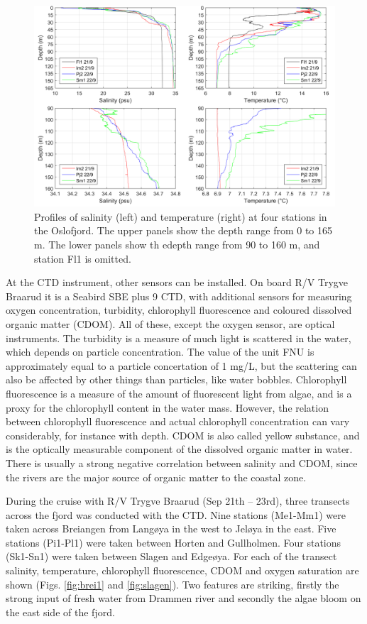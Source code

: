 \documentclass[12pt,a4paper,english]{article}
\begin{document}
\begin{figure}[ht]
\centerline{
\includegraphics*[width=\textwidth]{Figurer/Fig_profiles.png}}
\caption{\small
Profiles of salinity (left) and temperature (right) at four stations in the 
Oslofjord. The upper panels show the depth range from 0 to 165 m.
The lower panels show th edepth range from 90 to 160 m, and station Fl1 is omitted.
}
\label{fig:profiles}
\end{figure}

At the CTD instrument, other sensors can be installed. 
On board R/V Trygve Braarud it is a Seabird SBE plus 9 CTD, 
with additional sensors for measuring oxygen concentration, turbidity, 
chlorophyll fluorescence and coloured dissolved organic matter (CDOM). 
All of these, except the oxygen sensor, are optical instruments. 
The turbidity is a measure of much light is scattered in the water, 
which depends on particle concentration. The value of the unit FNU is 
approximately equal to a particle concertation of 1 mg/L, 
but the scattering can also be affected by other things than particles, 
like water bobbles. Chlorophyll fluorescence is a measure of the amount 
of fluorescent light from algae, and is a proxy for the chlorophyll content 
in the water mass. However, the relation between chlorophyll fluorescence 
and actual chlorophyll concentration can vary considerably, 
for instance with depth. 
CDOM is also called yellow substance, and is the optically measurable 
component of the dissolved organic matter in water. 
There is usually a strong negative correlation between salinity and CDOM, 
since the rivers are the major source of organic matter to the coastal zone. 

During the cruise with R/V Trygve Braarud (Sep 21th – 23rd), three transects 
across the fjord was conducted with the CTD. Nine stations (Me1-Mm1) were taken 
across Breiangen from Lang{\o}ya in the west to Jel{\o}ya in the east. 
Five stations (Pi1-Pl1) were taken between Horten and Gullholmen. 
Four stations (Sk1-Sn1) were taken between Slagen and Edge{\o}ya. 
For each of the transect salinity, temperature, chlorophyll fluorescence, 
CDOM and oxygen saturation are shown (Figs. \ref{fig:brei1} and \ref{fig:slagen}). 
Two features are striking, 
firstly the strong input of fresh water from Drammen river and secondly the algae bloom on the east side of the fjord.
\end{document}
